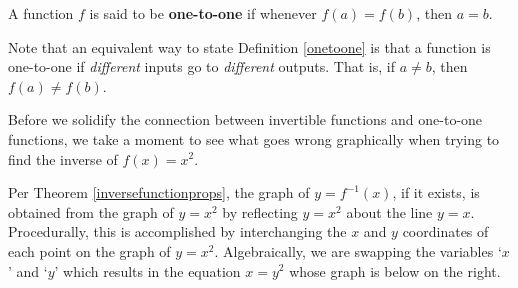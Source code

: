 \documentclass{ximera}
\begin{document}
\smallskip


\begin{definition} \label{onetoone}  A function $f$ is said to be  \textbf{one-to-one} if whenever $f(a) = f(b)$, then $a=b$. 

\end{definition}

\smallskip

Note that an equivalent way to state Definition \ref{onetoone} is that a function is one-to-one if \textit{different} inputs go to \textit{different} outputs. That is, if $a \neq b$, then $f(a) \neq f(b)$.

\smallskip

Before we solidify the connection between invertible functions and one-to-one functions, we take a moment to see what goes wrong graphically when trying to find the inverse of $f(x) = x^2$.

\smallskip

Per Theorem \ref{inversefunctionprops}, the graph of $y = f^{-1}(x)$, if it exists, is obtained from the graph of $y=x^2$  by reflecting $y=x^2$ about the line $y=x$.  Procedurally, this is accomplished by interchanging the $x$ and $y$ coordinates of each point on the graph of $y = x^2$.  Algebraically, we are swapping the variables `$x$' and `$y$' which results in the equation $x = y^2$ whose graph is below on the right. 
\end{document}
